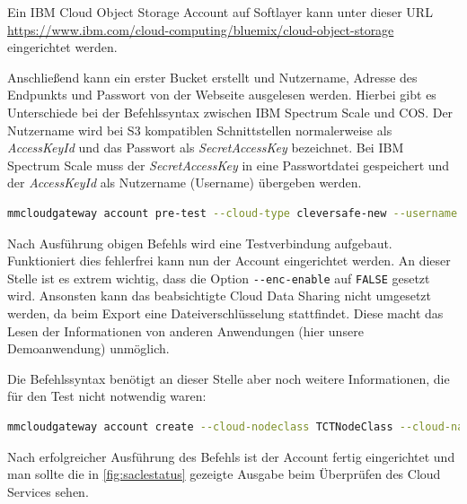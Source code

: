 Ein IBM Cloud Object Storage Account auf Softlayer kann unter dieser URL \url{https://www.ibm.com/cloud-computing/bluemix/cloud-object-storage} eingerichtet werden. 

Anschließend kann ein erster Bucket erstellt und Nutzername, Adresse des Endpunkts und Passwort von der Webseite ausgelesen werden. Hierbei gibt es Unterschiede bei der Befehlssyntax zwischen IBM Spectrum Scale und \ac{COS}. 
Der Nutzername wird bei S3 kompatiblen Schnittstellen normalerweise als \textit{AccessKeyId} und das Passwort als \textit{SecretAccessKey} bezeichnet. Bei IBM Spectrum Scale muss der \textit{SecretAccessKey} in eine Passwortdatei gespeichert und der \textit{AccessKeyId} als Nutzername (Username) übergeben werden.\\

\begin{lstlisting}[language=bash, caption=Vortest des Cloud Sharing Accounts]
mmcloudgateway account pre-test --cloud-type cleversafe-new --username "<username>" --pwd-file <path/file/your/secretAccessKey> --cloud-url <cos/endpoint>
\end{lstlisting}

Nach Ausführung obigen Befehls wird eine Testverbindung aufgebaut. Funktioniert dies fehlerfrei kann nun der Account eingerichtet werden. An dieser Stelle ist es extrem wichtig, dass die Option \lstinline|--enc-enable| auf \lstinline|FALSE| gesetzt wird. Ansonsten kann das beabsichtigte Cloud Data Sharing nicht umgesetzt werden, da beim Export eine Dateiverschlüsselung stattfindet. Diese macht das Lesen der Informationen von anderen Anwendungen (hier unsere Demoanwendung) unmöglich.

Die Befehlssyntax benötigt an dieser Stelle aber noch weitere Informationen, die für den Test nicht notwendig waren:\\

\begin{lstlisting}[language=bash, caption=Einrichtung des Cloud Sharing Accounts]
mmcloudgateway account create --cloud-nodeclass TCTNodeClass --cloud-name mcstore --cloud-type cleversafe-new --username "<username>" --pwd-file <path/file/your/secretAccessKey> --enable TRUE --cloud-url <cos/endpoint> --enc-enable FALSE
\end{lstlisting}

Nach erfolgreicher Ausführung des Befehls ist der Account fertig eingerichtet und man sollte die in \autoref{fig:saclestatus} gezeigte Ausgabe beim Überprüfen des Cloud Services sehen.

